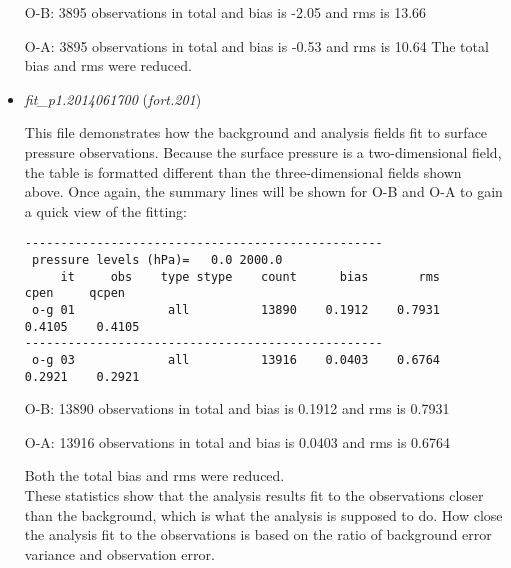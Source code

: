 \begin{itemize}[leftmargin=*]
\begin{tiny}
\begin{verbatim}
\end{verbatim}
\end{tiny}

\hspace{1cm} O-B: 3895 observations in total and bias is -2.05 and rms is 13.66

\hspace{1cm} O-A: 3895 observations in total and bias is -0.53 and rms is 10.64\newline
The total bias and rms were reduced. \\


\item \textit{fit\_p1.2014061700} (\textit{fort.201})

 This file demonstrates how the background and analysis fields fit to surface pressure observations.  Because the surface pressure is a two-dimensional field, the table is formatted different than the three-dimensional fields shown above.  Once again, the summary lines will be shown for O-B and O-A to gain a quick view of the fitting:
 
 \begin{scriptsize}
 \begin{verbatim}
--------------------------------------------------
 pressure levels (hPa)=   0.0 2000.0
     it     obs    type stype    count      bias       rms      cpen     qcpen
 o-g 01             all          13890    0.1912    0.7931    0.4105    0.4105
--------------------------------------------------
 o-g 03             all          13916    0.0403    0.6764    0.2921    0.2921 
 \end{verbatim}
 \end{scriptsize}
 
\hspace{1cm} O-B: 13890 observations in total and bias is 0.1912 and rms is 0.7931

\hspace{1cm} O-A: 13916 observations in total and bias is 0.0403 and rms is 0.6764\newline

Both the total bias and rms were reduced. \\

These statistics show that the analysis results fit to the observations closer than the background, which is what the analysis is supposed to do.  How close the analysis fit to the observations is based on the ratio of background error variance and observation error. 

\end{itemize}

